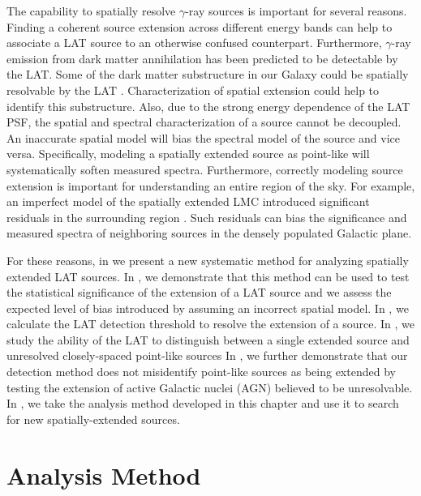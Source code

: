 The capability to spatially resolve \gev $\gamma$-ray sources is
important for several reasons.  Finding a coherent source extension
across different energy bands can help to associate a LAT source to an
otherwise confused counterpart.  Furthermore, $\gamma$-ray emission from
dark matter annihilation has been predicted to be detectable by the LAT.
Some of the dark matter substructure in our Galaxy could be spatially
resolvable by the LAT \citep{baltz_2008a_pre-launch-estimates}.
Characterization of spatial extension could help to identify this
substructure.  Also, due to the strong energy dependence of the LAT
PSF, the spatial and spectral characterization of a source cannot be
decoupled. An inaccurate spatial model will bias the spectral model of the
source and vice versa. Specifically, modeling a spatially extended source
as point-like will systematically soften measured spectra. Furthermore,
correctly modeling source extension is important for understanding an
entire region of the sky. For example, an imperfect model of the spatially
extended LMC introduced significant residuals in the surrounding region
\citep{abdo_2010b_fermi-large,nolan_2012_fermi-large}.  Such residuals
can bias the significance and measured spectra of neighboring sources
in the densely populated Galactic plane.

 For these reasons, in 
we present a new systematic method for analyzing spatially extended LAT
sources.  In , we demonstrate that this method
can be used to test the statistical significance of the extension of a LAT
source and we assess the expected level of bias introduced by assuming
an incorrect spatial model.  In ,
we calculate the LAT detection threshold to resolve the extension
of a source.  In , we study
the ability of the LAT to distinguish between a single extended
source and unresolved closely-spaced point-like sources In
, we further demonstrate that our
detection method does not misidentify point-like sources as being
extended by testing the extension of active Galactic nuclei (AGN)
believed to be unresolvable.  
In , we take the analysis
method developed in this chapter and use it to 
search for new spatially-extended sources.


\section{Analysis Method}

